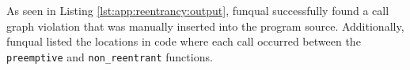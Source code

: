 As seen in Listing \ref{lst:app:reentrancy:output}, funqual successfully found a call graph violation that was manually inserted into the program source.  Additionally, funqual listed the locations in code where each call occurred between the \lstinline{preemptive} and \lstinline{non_reentrant} functions.  



